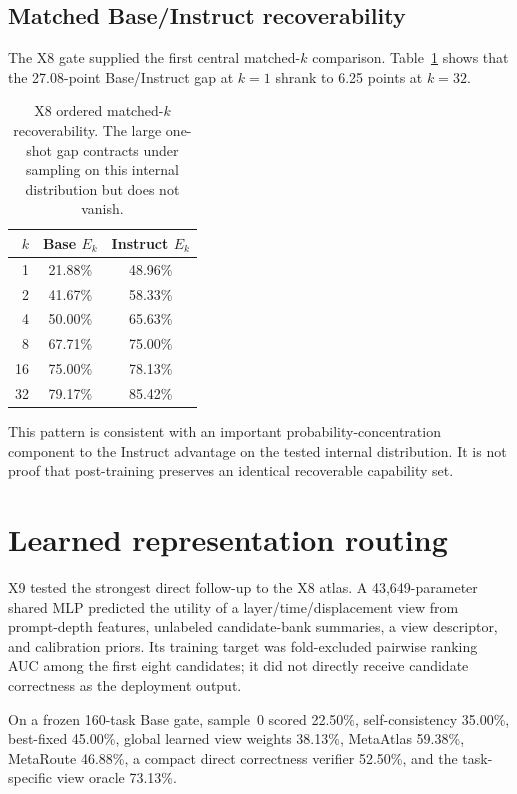 \documentclass[11pt]{article}
\begin{document}
\subsection{Matched Base/Instruct recoverability}

The X8 gate supplied the first central matched-$k$ comparison. Table~\ref{tab:x8recover} shows that the 27.08-point Base/Instruct gap at $k=1$ shrank to 6.25 points at $k=32$.

\begin{table}[h]
\centering
\begin{tabular}{rcc}
\toprule
$k$ & Base $E_k$ & Instruct $E_k$ \\
\midrule
1 & 21.88\% & 48.96\% \\
2 & 41.67\% & 58.33\% \\
4 & 50.00\% & 65.63\% \\
8 & 67.71\% & 75.00\% \\
16 & 75.00\% & 78.13\% \\
32 & 79.17\% & 85.42\% \\
\bottomrule
\end{tabular}
\caption{X8 ordered matched-$k$ recoverability. The large one-shot gap contracts under sampling on this internal distribution but does not vanish.}
\label{tab:x8recover}
\end{table}

This pattern is consistent with an important probability-concentration component to the Instruct advantage on the tested internal distribution. It is not proof that post-training preserves an identical recoverable capability set.

\section{Learned representation routing}

X9 tested the strongest direct follow-up to the X8 atlas. A 43,649-parameter shared MLP predicted the utility of a layer/time/displacement view from prompt-depth features, unlabeled candidate-bank summaries, a view descriptor, and calibration priors. Its training target was fold-excluded pairwise ranking AUC among the first eight candidates; it did not directly receive candidate correctness as the deployment output.

On a frozen 160-task Base gate, sample~0 scored 22.50\%, self-consistency 35.00\%, best-fixed 45.00\%, global learned view weights 38.13\%, MetaAtlas 59.38\%, MetaRoute 46.88\%, a compact direct correctness verifier 52.50\%, and the task-specific view oracle 73.13\%.
\end{document}
